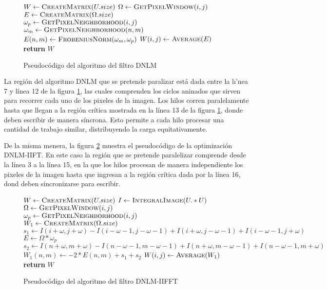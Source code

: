 \begin{figure}
\begin{algorithmic}[1]
\State $W\gets \Call{CreateMatrix}{U.size}$
		\State $\Omega\gets \Call{GetPixelWindow}{i,j}$
        \State $E\gets \Call{CreateMatrix}{\Omega.size}$
        \State $\omega_{p}\gets \Call{GetPixelNeighborhood}{i,j}$
        		\State $\omega_{m}\gets \Call{GetPixelNeighborhood}{n,m}$
                \State $E(n,m)\gets \Call{FrobeniusNorm}{\omega_m,\omega_p}$              
        	\EndFor 
        \EndFor 
        \State $W(i,j)\gets \Call{Average}{E}$
	\EndFor
\EndFor
\State \textbf{return} $W$
\end{algorithmic}
\caption{Pseudocódigo del algoritmo del filtro DNLM\label{fig:euclid}}
\end{figure}

La región del algoritmo DNLM que se pretende paralizar está dada entre la l\i'nea 7 y línea 12 de la figura \ref{fig:euclid}, las cuales comprenden los ciclos aninados que sirven para recorrer cada uno de los pixeles de la imagen. Los hilos corren paralelamente hasta que llegan a la región crítica mostrada en la línea 13 de la figura \ref{fig:euclid}, donde deben escribir de manera síncrona. Esto permite a cada hilo procesar una cantidad de trabajo similar, distribuyendo la carga equitativamente.

De la misma menera, la figura \ref{fig:euclid2} muestra el pseudocódigo de la optimización DNLM-IIFT. En este caso la región que se pretende paralelizar comprende desde la línea 3 a la línea 15, en la que los hilos procesan de manera independiente los pixeles de la imagen hasta que ingresan a la región crítica dada por la línea 16, dond deben sincronizarse para escribir.

\begin{figure}

\begin{algorithmic}[1]
\State $W\gets \Call{CreateMatrix}{U.size}$
\State $I\gets \Call{IntegralImage}{U.*U}$
		\State $\Omega\gets \Call{GetPixelWindow}{i,j}$
        \State $\omega_{p}\gets \Call{GetPixelNeighborhood}{i,j}$
        \State $W_{1}\gets \Call{CreateMatrix}{\Omega.size}$
        \State $s_{1} \gets I(i+\omega,j+\omega)-I(i-\omega-1,j-\omega-1)+I(i+\omega,j-\omega-1)+I(i-\omega-1,j+\omega)$
        \State $E\gets \Omega * \omega_{p}$ 
        		\State $s_{2} \gets I(n+\omega,m+\omega)-I(n-\omega-1,m-\omega-1)+I(n+\omega,m-\omega-1)+I(n-\omega-1,m+\omega)$
        		\State $W_{1}(n,m)\gets -2*E(n,m) + s_{1} + s_{2}$
        	\EndFor 
        \EndFor 
        \State $W(i,j)\gets \Call{Average}{W_{1}}$
	\EndFor
\EndFor
\State \textbf{return} $W$
\end{algorithmic}
\caption{Pseudocódigo del algoritmo del filtro DNLM-IIFFT}\label{fig:euclid2}
\end{figure}

